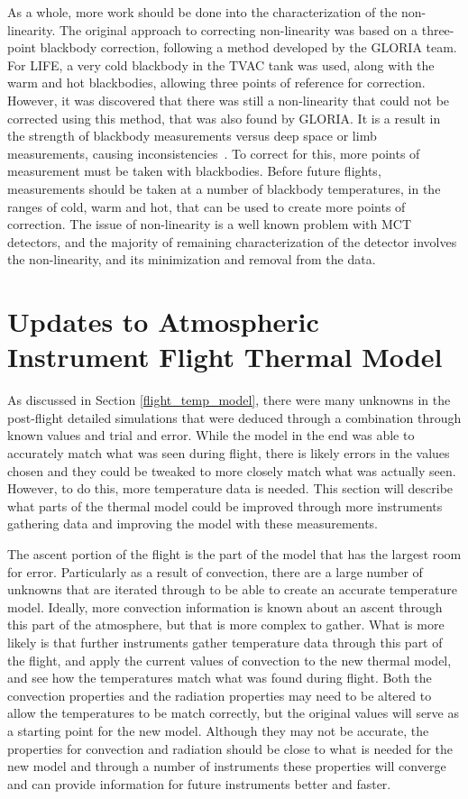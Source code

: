 As a whole, more work should be done into the characterization of the non-linearity. The original approach to correcting non-linearity was based on a three-point blackbody correction, following a method developed by the GLORIA team. For LIFE, a very cold blackbody in the TVAC tank was used, along with the warm and hot blackbodies, allowing three points of reference for correction. However, it was discovered that there was still a non-linearity that could not be corrected using this method, that was also found by GLORIA. It is a result in the strength of blackbody measurements versus deep space or limb measurements, causing inconsistencies~\citep{GLORIA_nonlinearity_PhD}. To correct for this, more points of measurement must be taken with blackbodies. Before future flights, measurements should be taken at a number of blackbody temperatures, in the ranges of cold, warm and hot, that can be used to create more points of correction. The issue of non-linearity is a well known problem with MCT detectors, and the majority of remaining characterization of the detector involves the non-linearity, and its minimization and removal from the data.

\section{Updates to Atmospheric Instrument Flight Thermal Model}
As discussed in Section \ref{flight_temp_model}, there were many unknowns in the post-flight detailed simulations that were deduced through a combination through known values and trial and error. While the model in the end was able to accurately match what was seen during flight, there is likely errors in the values chosen and they could be tweaked to more closely match what was actually seen. However, to do this, more temperature data is needed. This section will describe what parts of the thermal model could be improved through more instruments gathering data and improving the model with these measurements.

The ascent portion of the flight is the part of the model that has the largest room for error. Particularly as a result of convection, there are a large number of unknowns that are iterated through to be able to create an accurate temperature model. Ideally, more convection information is known about an ascent through this part of the atmosphere, but that is more complex to gather. What is more likely is that further instruments gather temperature data through this part of the flight, and apply the current values of convection to the new thermal model, and see how the temperatures match what was found during flight. Both the convection properties and the radiation properties may need to be altered to allow the temperatures to be match correctly, but the original values will serve as a starting point for the new model. Although they may not be accurate, the properties for convection and radiation should be close to what is needed for the new model and through a number of instruments these properties will converge and can provide information for future instruments better and faster. 

